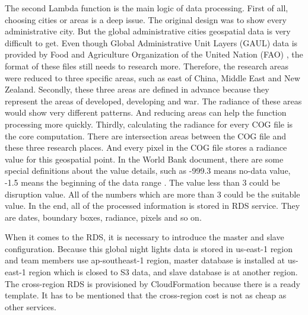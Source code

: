 \documentclass[conference]{IEEEtran}
\begin{document}
The second Lambda function is the main logic of data processing. First of all, choosing cities or areas is a deep issue. The original design was to show every administrative 
city. But the global administrative cities geospatial data is very difficult to get. Even though Global Administrative Unit Layers (GAUL) data is provided by Food and 
Agriculture Organization of the United Nation (FAO) \cite{GlobalAd98:online}, the format of these files still needs to research more. Therefore, the research areas were reduced 
to three specific areas, such as east of China, Middle East and New Zealand. Secondly, these three areas are defined in advance because they represent the areas of developed, 
developing and war. The radiance of these areas would show very different patterns. And reducing areas can help the function processing more quickly. Thirdly, calculating the 
radiance for every COG file is the core computation. There are intersection areas between the COG file and these three research places. And every pixel in the COG file stores 
a radiance value for this geospatial point. In the World Bank document, there are some special definitions about the value details, such as -999.3 means no-data value, -1.5 
means the beginning of the data range \cite{WorldBan13:online}. The value less than 3 could be disruption value. All of the numbers which are more than 3 could be the 
suitable value. In the end, all of the processed information is stored in RDS service. They are dates, boundary boxes, radiance, pixels and so on.

When it comes to the RDS, it is necessary to introduce the master and slave configuration. Because this global night lights data is stored in us-east-1 region and team members 
use ap-southeast-1 region, master database is installed at us-east-1 region which is closed to S3 data, and slave database is at another region. The cross-region RDS is 
provisioned by CloudFormation because there is a ready template. It has to be mentioned that the cross-region cost is not as cheap as other services.
\end{document}
